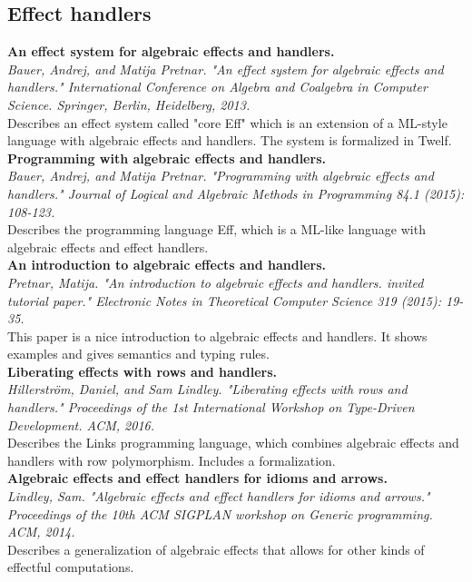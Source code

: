 \documentclass[12pt]{article}
\begin{document}
\subsection{Effect handlers}
\textbf{An effect system for algebraic effects and handlers.} \\
\textit{Bauer, Andrej, and Matija Pretnar. "An effect system for algebraic effects and handlers." International Conference on Algebra and Coalgebra in Computer Science. Springer, Berlin, Heidelberg, 2013.} \\
Describes an effect system called "core Eff" which is an extension of a ML-style language with algebraic effects and handlers. The system is formalized in Twelf.
\\
\textbf{Programming with algebraic effects and handlers.} \\
\textit{Bauer, Andrej, and Matija Pretnar. "Programming with algebraic effects and handlers." Journal of Logical and Algebraic Methods in Programming 84.1 (2015): 108-123.} \\
Describes the programming language Eff, which is a ML-like language with algebraic effects and effect handlers.
\\
\textbf{An introduction to algebraic effects and handlers.} \\
\textit{Pretnar, Matija. "An introduction to algebraic effects and handlers. invited tutorial paper." Electronic Notes in Theoretical Computer Science 319 (2015): 19-35.} \\
This paper is a nice introduction to algebraic effects and handlers. It shows examples and gives semantics and typing rules.
\\
\textbf{Liberating effects with rows and handlers.} \\
\textit{Hillerstr\"{o}m, Daniel, and Sam Lindley. "Liberating effects with rows and handlers." Proceedings of the 1st International Workshop on Type-Driven Development. ACM, 2016.} \\
Describes the Links programming language, which combines algebraic effects and handlers with row polymorphism. Includes a formalization.
\\
\textbf{Algebraic effects and effect handlers for idioms and arrows.} \\
\textit{Lindley, Sam. "Algebraic effects and effect handlers for idioms and arrows." Proceedings of the 10th ACM SIGPLAN workshop on Generic programming. ACM, 2014.} \\
Describes a generalization of algebraic effects that allows for other kinds of effectful computations.
\end{document}
